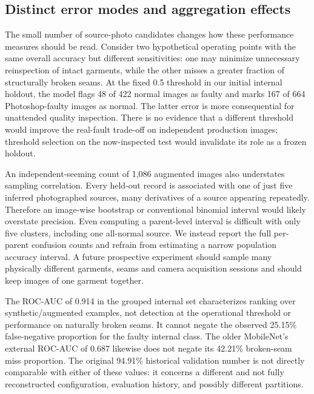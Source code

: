 \documentclass[conference,a4paper]{IEEEtran}
\begin{document}
\subsection{Distinct error modes and aggregation effects}
The small number of source-photo candidates changes how these performance measures should be read. Consider two hypothetical operating points with the same overall accuracy but different sensitivities: one may minimize unnecessary reinspection of intact garments, while the other misses a greater fraction of structurally broken seams. At the fixed 0.5 threshold in our initial internal holdout, the model flags 48 of 422 normal images as faulty and marks 167 of 664 Photoshop-faulty images as normal. The latter error is more consequential for unattended quality inspection. There is no evidence that a different threshold would improve the real-fault trade-off on independent production images; threshold selection on the now-inspected test would invalidate its role as a frozen holdout.

An independent-seeming count of 1,086 augmented images also understates sampling correlation. Every held-out record is associated with one of just five inferred photographed sources, many derivatives of a source appearing repeatedly. Therefore an image-wise bootstrap or conventional binomial interval would likely overstate precision. Even computing a parent-level interval is difficult with only five clusters, including one all-normal source. We instead report the full per-parent confusion counts and refrain from estimating a narrow population accuracy interval. A future prospective experiment should sample many physically different garments, seams and camera acquisition sessions and should keep images of one garment together.

The ROC-AUC of 0.914 in the grouped internal set characterizes ranking over synthetic/augmented examples, not detection at the operational threshold or performance on naturally broken seams. It cannot negate the observed 25.15\% false-negative proportion for the faulty internal class. The older MobileNet's external ROC-AUC of 0.687 likewise does not negate its 42.21\% broken-seam miss proportion. The original 94.91\% historical validation number is not directly comparable with either of these values: it concerns a different and not fully reconstructed configuration, evaluation history, and possibly different partitions.
\end{document}
